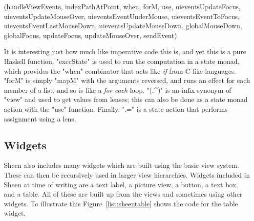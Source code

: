 \functions(handleViewEvents, indexPathAtPoint, when, forM, use, uieventsUpdateFocus, uieventsUpdateMouseOver, uieventsEventUnderMouse, uieventsEventToFocus, uieventsEventLastMouseDown, uieventsUpdateMouseDown, globalMouseDown, globalFocus, updateFocus, updateMouseOver, sendEvent)
\noindent 
It is interesting just how much like imperative code this is, and yet this is a pure Haskell function. "execState" is used to run the computation in a state monad, which provides the "when" combinator that acts like \emph{if} from C like languages. "forM" is simply "mapM" with the arguments reversed, and runs an effect for each member of a list, and so is like a \emph{for-each} loop. "(.^)" is an infix synonym of "view" and used to get values from lenses; this can also be done as a state monad action with the "use" function. Finally, ".=" is a state action that performs assignment using a lens.

\subsection{Widgets}

Sheen also includes many widgets which are built using the basic view system. These can then be recursively used in larger view hierarchies. Widgets included in Sheen at time of writing are a text label, a picture view, a button, a text box, and a table. All of these are built up from the views and sometimes using other widgets. To illustrate this Figure~\ref{list:sheentable} shows the code for the table widget.

